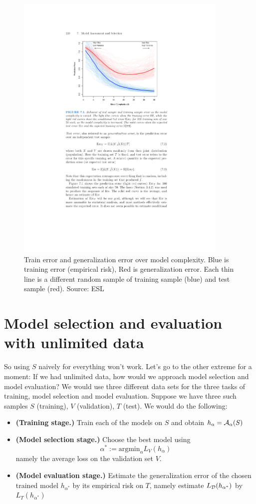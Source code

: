 \begin{figure}[H]
  \centering
  \includegraphics[width=4in]{train_vs_gen.pdf}
  \caption{Train error and generalization error over model complexity. Blue is
    training error (empirical risk), Red is generalization error. Each thin line
    is a different random sample of training sample (blue) and test sample
    (red).  Source: ESL}
\end{figure}

\section{Model selection and evaluation with unlimited data}

So using $S$ naively for everything won't work.
Let's go to the other extreme for a moment: 
If we had unlimited data, how would we approach model selection and model
evaluation? We would use three different data sets 
for the three tasks of training, model selection and model evaluation. 
Suppose we have three such samples $S$ (training), $V$ (validation), $T$ (test). 
We would do the following:
\begin{itemize}
  \item {\bf (Training stage.)} Train each of the models on $S$ and obtain $h_\alpha=\mathcal{A}_\alpha(S)$
  \item {\bf (Model selection stage.)} Choose the best model using 
    \[
      \alpha^* := \text{argmin}_\alpha L_V(h_\alpha)
    \]
    namely the average loss on the validation set $V$.
  \item {\bf (Model evaluation stage.)} 
    Estimate the generalization error of the chosen trained model $h_{\alpha^*}$
    by
    its empirical risk on $T$, namely estimate $L_{\mathcal{D}}(h_{\alpha^*})$ by
    $L_T(h_{\alpha^*})$
    
\end{itemize}

